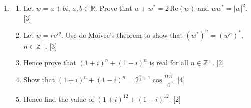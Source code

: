 \documentclass[12pt, twoside]{article}
\begin{document}
\begin{enumerate}[itemsep=0.15cm]

\newpage

\item[4.] [Maximum mark: 14]

\begin{enumerate}[itemsep=0.1cm]
  \item Let $w = a + bi$, $a, b \in \mathbb{R}$. Prove that
  $w + w^{*} = 2\,\mathrm{Re}(w)$ and $ww^{*} = |w|^{2}$. \hfill [3]
  \item Let $w = re^{i\theta}$. Use de Moivre's theorem to show that
  $\left(w^{*}\right)^{n} = \left(w^{n}\right)^{*}$, $n \in \mathbb{Z}^{+}$.
  \hfill [3]
  \item Hence prove that $(1 + i)^{n} + (1 - i)^{n}$ is real for all
  $n \in \mathbb{Z}^{+}$. \hfill [2]
  \item Show that $(1 + i)^{n} + (1 - i)^{n} =
  2^{\frac{n}{2} + 1}\cos\dfrac{n\pi}{4}$. \hfill [4]
  \item Hence find the value of $(1 + i)^{12} + (1 - i)^{12}$. \hfill [2]
\end{enumerate}


\end{enumerate}
\end{document}
